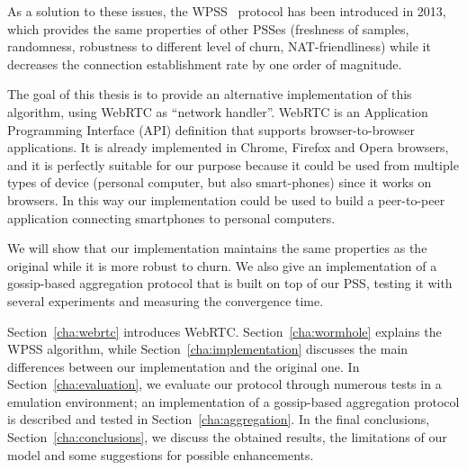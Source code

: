 As a solution to these issues, the \ac{WPSS}~\cite{wormhole} protocol has been introduced in 2013, which provides the same properties of other PSSes (freshness of samples, randomness, robustness to different level of churn, NAT-friendliness) while it decreases the connection establishment rate by one order of magnitude. 

The goal of this thesis is to provide an alternative implementation of this algorithm, using WebRTC as ``network handler''. WebRTC is an Application Programming Interface (API) definition that supports browser-to-browser applications. It is already implemented in Chrome, Firefox and Opera browsers, and it is perfectly suitable for our purpose because it could be used from multiple types of device (personal computer, but also smart-phones) since it works on browsers. In this way our implementation could be used to build a peer-to-peer application connecting smartphones to  personal computers.

We will show that our implementation maintains the same properties as the original while it is more robust to churn. We also give an implementation of a gossip-based aggregation protocol that is built on top of our PSS, testing it with several experiments and measuring the convergence time.

Section~\ref{cha:webrtc} introduces WebRTC. Section~\ref{cha:wormhole} explains the \ac{WPSS} algorithm, while Section~\ref{cha:implementation} discusses the main differences between our implementation and the original one. In Section~\ref{cha:evaluation}, we evaluate our protocol through numerous tests in a emulation environment; an implementation of a gossip-based aggregation protocol is described and tested in Section~\ref{cha:aggregation}. In the final conclusions, Section~\ref{cha:conclusions}, we discuss the obtained results, the limitations of our model and some suggestions for possible enhancements.
